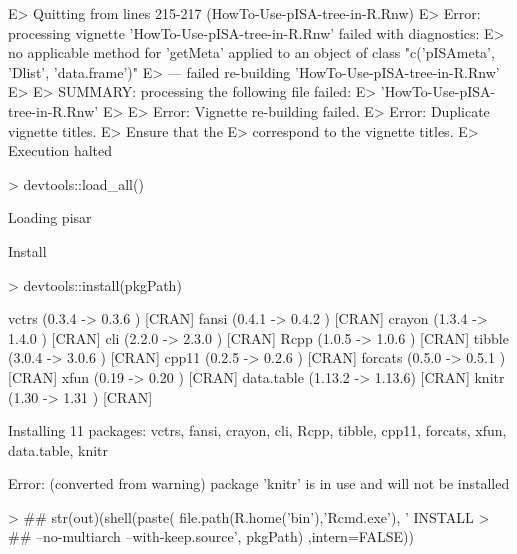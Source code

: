 \documentclass[a4paper,12pt]{article}\usepackage[]{graphicx}\usepackage[]{color}
\begin{document}
\begin{Schunk}
\begin{Soutput}
E> Quitting from lines 215-217 (HowTo-Use-pISA-tree-in-R.Rnw) 
E> Error: processing vignette 'HowTo-Use-pISA-tree-in-R.Rnw' failed with diagnostics:
E> no applicable method for 'getMeta' applied to an object of class "c('pISAmeta', 'Dlist', 'data.frame')"
E> --- failed re-building 'HowTo-Use-pISA-tree-in-R.Rnw'
E> 
E> SUMMARY: processing the following file failed:
E>   'HowTo-Use-pISA-tree-in-R.Rnw'
E> 
E> Error: Vignette re-building failed.
E> Error: Duplicate vignette titles.
E>   Ensure that the %\VignetteIndexEntry lines in the vignette sources
E>   correspond to the vignette titles.
E> Execution halted
\end{Soutput}
\begin{Sinput}
> devtools::load_all()
\end{Sinput}
\begin{Soutput}
Loading pisar
\end{Soutput}
\end{Schunk}



Install

\begin{Schunk}
\begin{Sinput}
> devtools::install(pkgPath)
\end{Sinput}
\begin{Soutput}
vctrs      (0.3.4  -> 0.3.6 ) [CRAN]
fansi      (0.4.1  -> 0.4.2 ) [CRAN]
crayon     (1.3.4  -> 1.4.0 ) [CRAN]
cli        (2.2.0  -> 2.3.0 ) [CRAN]
Rcpp       (1.0.5  -> 1.0.6 ) [CRAN]
tibble     (3.0.4  -> 3.0.6 ) [CRAN]
cpp11      (0.2.5  -> 0.2.6 ) [CRAN]
forcats    (0.5.0  -> 0.5.1 ) [CRAN]
xfun       (0.19   -> 0.20  ) [CRAN]
data.table (1.13.2 -> 1.13.6) [CRAN]
knitr      (1.30   -> 1.31  ) [CRAN]
\end{Soutput}
\begin{Soutput}
Installing 11 packages: vctrs, fansi, crayon, cli, Rcpp, tibble, cpp11, forcats, xfun, data.table, knitr
\end{Soutput}
\begin{Soutput}
Error: (converted from warning) package 'knitr' is in use and will not be installed
\end{Soutput}
\begin{Sinput}
> ## str(out)(shell(paste( file.path(R.home('bin'),'Rcmd.exe'), ' INSTALL
> ## --no-multiarch --with-keep.source', pkgPath) ,intern=FALSE))
\end{Sinput}
\end{Schunk}
\end{document}
